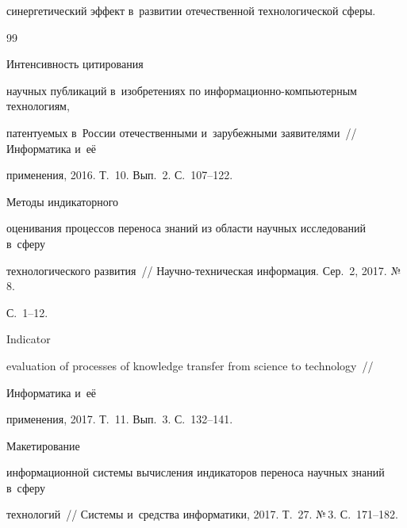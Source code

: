 синергетический эффект в~развитии отечественной технологической сферы.


     


{\small\frenchspacing


{%




\begin{thebibliography}{99}






Интенсивность цитирования 


научных публикаций в~изобретениях по информационно-компьютерным технологиям, 


патентуемых в~России отечественными и~зарубежными заявителями~/\!\!/ Информатика и~её 


применения, 2016. Т.~10. Вып.~2. С.~107--122.




 Методы индикаторного 


оценивания процессов переноса знаний из области научных исследований в~сферу 


технологического развития~/\!\!/ На\-уч\-но-тех\-ни\-че\-ская информация. Сер.~2, 2017. №\,8. 


С.~1--12.




 Indicator 


evaluation of processes of knowledge transfer from science to technology~/\!\!/ 


Информатика и~её 


применения, 2017. Т.~11. Вып.~3. С.~132--141.










 Макетирование 


информационной системы вычисления индикаторов переноса научных знаний в~сферу 


технологий~/\!\!/ Системы и~средства информатики, 2017. Т.~27. №\,3. С.~171--182.



\end{thebibliography}}}
